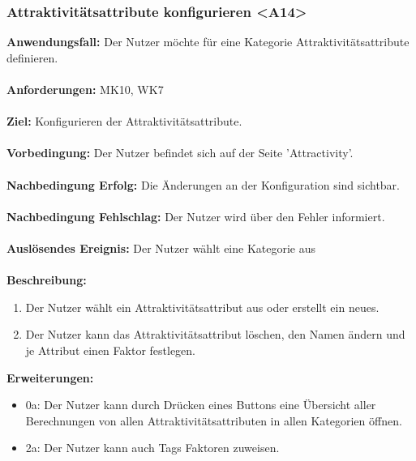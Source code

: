 \documentclass[parskip=full]{scrartcl} %
\begin{document}
\subsubsection*{Attraktivitätsattribute konfigurieren <A14>}
\textbf{Anwendungsfall:} Der Nutzer möchte für eine Kategorie Attraktivitätsattribute definieren.\\\\
\textbf{Anforderungen:} MK10, WK7\\\\
\textbf{Ziel:} Konfigurieren der Attraktivitätsattribute. \\\\
\textbf{Vorbedingung:} Der Nutzer befindet sich auf der Seite 'Attractivity'. \\\\
\textbf{Nachbedingung Erfolg:} Die Änderungen an der Konfiguration sind sichtbar. \\\\
\textbf{Nachbedingung Fehlschlag:} Der Nutzer wird über den Fehler informiert. \\\\
\textbf{Auslösendes Ereignis:} Der Nutzer wählt eine Kategorie aus \\\\
\textbf{Beschreibung:}
\begin{enumerate}
    \item Der Nutzer wählt ein Attraktivitätsattribut aus oder erstellt ein neues.
    \item Der Nutzer kann das Attraktivitätsattribut löschen, den Namen ändern und je Attribut einen Faktor festlegen.
\end{enumerate}
\textbf{Erweiterungen:} 
\begin{itemize}
    \item 0a: Der Nutzer kann durch Drücken eines Buttons eine Übersicht aller Berechnungen von allen Attraktivitätsattributen in allen Kategorien öffnen. 
    \item 2a: Der Nutzer kann auch Tags Faktoren zuweisen.
\end{itemize}
\newpage
\end{document}
